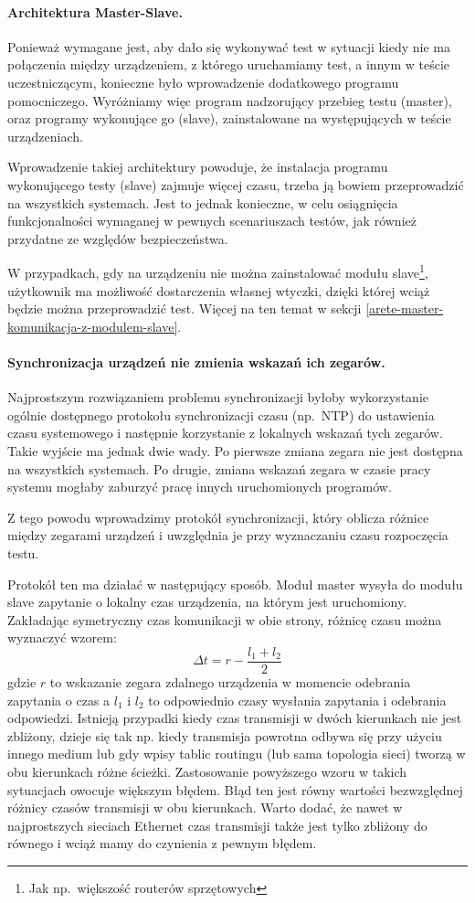 \documentclass[00-praca-magisterska.tex]{subfiles}
\begin{document}
\paragraph{Architektura Master-Slave.} Ponieważ wymagane jest, aby dało się
wykonywać test w sytuacji kiedy nie ma połączenia między urządzeniem, z którego
uruchamiamy test, a innym w teście uczestniczącym, konieczne było wprowadzenie
dodatkowego programu pomocniczego. Wyróżniamy więc program nadzorujący
przebieg testu (master), oraz programy wykonujące go (slave), zainstalowane na
występujących w teście urządzeniach.

Wprowadzenie takiej architektury powoduje, że instalacja programu wykonującego
testy (slave) zajmuje więcej czasu, trzeba ją bowiem przeprowadzić na
wszystkich systemach. Jest to jednak konieczne, w celu osiągnięcia
funkcjonalności wymaganej w pewnych scenariuszach testów, jak również przydatne
ze względów bezpieczeństwa.

W przypadkach, gdy na urządzeniu nie można zainstalować modułu
slave\footnote{Jak np.~większość routerów sprzętowych}, użytkownik ma możliwość
dostarczenia własnej wtyczki, dzięki której wciąż będzie można przeprowadzić
test. Więcej na ten temat w sekcji \ref{arete-master-komunikacja-z-modulem-slave}.

\paragraph{Synchronizacja urządzeń nie zmienia wskazań ich zegarów.}
Najprostszym rozwiązaniem problemu synchronizacji byłoby wykorzystanie ogólnie
dostępnego protokołu synchronizacji czasu (np.~NTP) do ustawienia czasu
systemowego i następnie korzystanie z lokalnych wskazań tych zegarów. Takie
wyjście ma jednak dwie wady. Po pierwsze zmiana zegara nie jest dostępna na
wszystkich systemach. Po drugie, zmiana wskazań zegara w czasie pracy systemu
mogłaby zaburzyć pracę innych uruchomionych programów.

Z tego powodu wprowadzimy protokół synchronizacji, który oblicza różnice między
zegarami urządzeń i uwzględnia je przy wyznaczaniu czasu rozpoczęcia testu.

Protokół ten ma działać w następujący sposób. Moduł master wysyła do modułu
slave zapytanie o lokalny czas urządzenia, na którym jest uruchomiony.
Zakładając symetryczny czas komunikacji w obie strony, różnicę czasu można
wyznaczyć wzorem: $$\Delta t = r - \frac{l_1 + l_2}{2}$$ gdzie $r$ to wskazanie
zegara zdalnego urządzenia w momencie odebrania zapytania o czas a $l_1$ i
$l_2$ to odpowiednio czasy wysłania zapytania i odebrania odpowiedzi. Istnieją
przypadki kiedy czas transmisji w dwóch kierunkach nie jest zbliżony, dzieje
się tak np. kiedy transmisja powrotna odbywa się przy użyciu innego medium lub
gdy wpisy tablic routingu (lub sama topologia sieci) tworzą w obu kierunkach
różne ścieżki. Zastosowanie powyższego wzoru w takich sytuacjach owocuje
większym błędem. Błąd ten jest równy wartości bezwzględnej różnicy czasów
transmisji w obu kierunkach. Warto dodać, że nawet w najprostszych sieciach
Ethernet czas transmisji także jest tylko zbliżony do równego i wciąż mamy do
czynienia z pewnym błędem.
\end{document}

